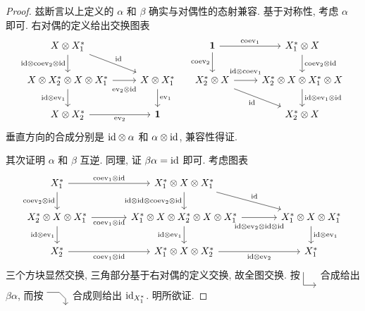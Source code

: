 \begin{proof}
	兹断言以上定义的 $\alpha$ 和 $\beta$ 确实与对偶性的态射兼容. 基于对称性, 考虑 $\alpha$ 即可. 右对偶的定义给出交换图表
	\[\begin{tikzcd}
		X \otimes X_1^* \arrow[rd, "{\identity}"] \arrow[d, "{\identity \otimes \mathrm{coev}_2 \otimes \identity}"'] & \\
		X \otimes X_2^* \otimes X \otimes X_1^* \arrow[r, "{\mathrm{ev}_2 \otimes \identity}"' inner sep=0.6em] \arrow[d, "{\identity \otimes \mathrm{ev}_1}"'] & X \otimes X_1^* \arrow[d, "{\mathrm{ev}_1}"] \\
		X \otimes X_2^* \arrow[r, "{\mathrm{ev}_2}"'] & \munit
	\end{tikzcd} \quad \begin{tikzcd}
		\munit \arrow[r, "{\mathrm{coev}_1}"] \arrow[d, "{\mathrm{coev}_2}"'] & X_1^* \otimes X \arrow[d, "{\mathrm{coev}_2 \otimes \identity}"] \\
		X_2^* \otimes X \arrow[r, "{\identity \otimes \mathrm{coev}_1}" inner sep=0.6em] \arrow[rd, "{\identity}"'] & X_2^* \otimes X \otimes X_1^* \otimes X \arrow[d, "{\identity \otimes \mathrm{ev}_1 \otimes \identity}"] \\
		& X_2^* \otimes X
	\end{tikzcd}\]
	垂直方向的合成分别是 $\mathrm{id} \otimes \alpha$ 和 $\alpha \otimes \mathrm{id}$, 兼容性得证.
	
	其次证明 $\alpha$ 和 $\beta$ 互逆. 同理, 证 $\beta\alpha = \mathrm{id}$ 即可. 考虑图表
	\[\begin{tikzcd}[column sep=large]
		X_1^* \arrow[d, "{\mathrm{coev}_2 \otimes \identity}"'] \arrow[r, "{\mathrm{coev}_1 \otimes \identity}"] & X_1^* \otimes X \otimes X_1^* \arrow[d, "{\identity \otimes \identity \otimes \mathrm{coev}_2 \otimes \identity}"'] \arrow[rd, "\identity"] & \\
		X_2^* \otimes X \otimes X_1^* \arrow[r, "{\mathrm{coev}_1 \otimes \identity}"'] \arrow[d, "{\identity \otimes \mathrm{ev}_1}"'] & X_1^* \otimes X \otimes X_2^* \otimes X \otimes X_1^* \arrow[d, "{\identity \otimes \mathrm{ev}_1}"'] \arrow[r, "{\identity \otimes \mathrm{ev}_2 \otimes \identity \otimes \identity}"' inner sep=0.6em] &  X_1^* \otimes X \otimes X_1^* \arrow[d, "{\identity \otimes \mathrm{ev}_1}"] \\
		X_2^* \arrow[r, "{\mathrm{coev}_1 \otimes \identity}"'] & X_1^* \otimes X \otimes X_2^* \arrow[r, "{\identity \otimes \mathrm{ev}_2}"'] & X_1^*
	\end{tikzcd}\]
	三个方块显然交换, 三角部分基于右对偶的定义交换, 故全图交换. 按
	$\begin{tikzpicture}[baseline=(O), scale=0.45]
		\coordinate (O) at (0, 0.5);
		\draw[->] (0, 1) -- (0, 0) -- (1, 0);
	\end{tikzpicture}$
	合成给出 $\beta\alpha$, 而按
	$\begin{tikzpicture}[baseline=(O), scale=0.45]
		\coordinate (O) at (0, 0.5);
		\draw[->] (0, 1) -- (1, 1) -- (1.5, 0.5) -- (1.5, 0);
	\end{tikzpicture}$
	合成则给出 $\mathrm{id}_{X_1^*}$. 明所欲证.
\end{proof}

